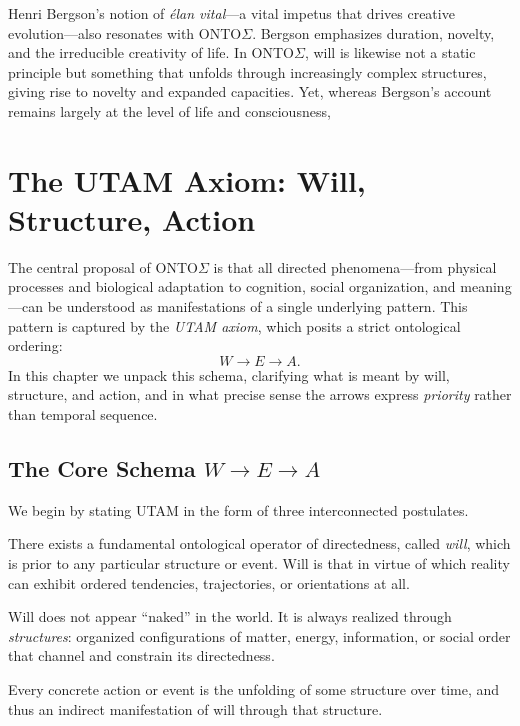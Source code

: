 \documentclass[12pt,a4paper]{report}
\newcommand{\Will}{W}
\newcommand{\Struct}{E}
\newcommand{\Act}{A}
\begin{document}
Henri Bergson's notion of \emph{élan vital}---a vital impetus that drives creative evolution---also resonates with ONTO$\Sigma$. Bergson emphasizes duration, novelty, and the irreducible creativity of life. In ONTO$\Sigma$, will is likewise not a static principle but something that unfolds through increasingly complex structures, giving rise to novelty and expanded capacities. Yet, whereas Bergson's account remains largely at the level of life and consciousness,


\chapter{The UTAM Axiom: Will, Structure, Action}

The central proposal of ONTO$\Sigma$ is that all directed phenomena---from physical processes and biological adaptation to cognition, social organization, and meaning---can be understood as manifestations of a single underlying pattern. This pattern is captured by the \emph{UTAM axiom}, which posits a strict ontological ordering:
\[
    \Will \to \Struct \to \Act.
\]
In this chapter we unpack this schema, clarifying what is meant by will, structure, and action, and in what precise sense the arrows express \emph{priority} rather than temporal sequence.

\section{The Core Schema \(W \to E \to A\)}

We begin by stating UTAM in the form of three interconnected postulates.

\begin{description}[leftmargin=2em]
    \item[Primacy of Will (\(\Will\)).] There exists a fundamental ontological operator of directedness, called \emph{will}, which is prior to any particular structure or event. Will is that in virtue of which reality can exhibit ordered tendencies, trajectories, or orientations at all.
    \item[Mediation by Structure (\(\Struct\)).] Will does not appear ``naked'' in the world. It is always realized through \emph{structures}: organized configurations of matter, energy, information, or social order that channel and constrain its directedness.
    \item[Actualization as Action (\(\Act\)).] Every concrete action or event is the unfolding of some structure over time, and thus an indirect manifestation of will through that structure.
\end{description}
\end{document}
